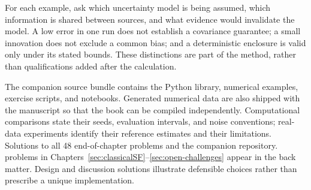 \documentclass[graybox,envcountchap]{style/SNmono}
\providecommand{\DIFadd}[1]{{\protect\color{blue} #1}} %
\providecommand{\DIFdel}[1]{{\protect\color{red} #1}} %
\providecommand{\DIFaddbegin}{} %
\providecommand{\DIFaddend}{} %
\providecommand{\DIFdelbegin}{} %
\providecommand{\DIFdelend}{} %
\begin{document}
\DIFadd{For each example, ask which uncertainty model is being assumed, which information is shared between sources, and what evidence would invalidate the model. A low error in one run does not establish a covariance guarantee; a small innovation does not exclude a common bias; and a deterministic enclosure is valid only under its stated bounds. These distinctions are part of the method, rather than qualifications added after the calculation.
}

\DIFadd{The companion source bundle contains the Python library, numerical examples, exercise scripts, and notebooks. Generated numerical data are also shipped with the manuscript so that the book can be compiled independently. Computational comparisons state their seeds, evaluation intervals, and noise conventions; real-data experiments identify their reference estimates and their limitations. Solutions to all 48 }\DIFaddend end-of-chapter \DIFdelbegin \DIFdel{problems and the companion repository. }%
\DIFdelend \DIFaddbegin \DIFadd{problems in Chapters~\ref{sec:classicalSF}--\ref{sec:open-challenges} appear in the back matter. Design and discussion solutions illustrate defensible choices rather than prescribe a unique implementation.
}\DIFaddend 


\clearpage

\clearpage


    
\end{document}
